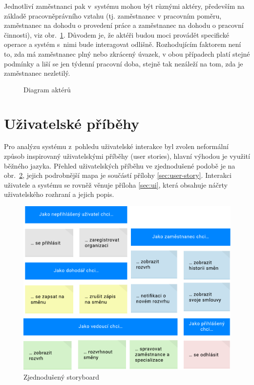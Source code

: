 \documentclass[twoside]{ctuthesis}
\begin{document}
Jednotliví zaměstnanci pak v~systému mohou být různými aktéry, především na základě pracovněprávního vztahu (tj. zaměstnanec v pracovním poměru, zaměstnanec na dohodu o provedení práce a zaměstnanec na dohodu o pracovní činnosti), viz obr.~\ref{fig:userroles}. Důvodem je, že aktéři budou moci provádět specifické operace a systém s~nimi bude interagovat odlišně. Rozhodujícím faktorem není to, zda má zaměstnanec plný nebo zkrácený úvazek, v obou případech platí stejné podmínky a liší se jen týdenní pracovní doba, stejně tak nezáleží na tom, zda je zaměstnanec nezletilý.

\begin{figure}[h]
	
	\caption{Diagram aktérů}
	\label{fig:userroles}
\end{figure}

\newpage
\section{Uživatelské příběhy}\label{uc-analysis}

Pro analýzu systému z~pohledu uživatelské interakce byl zvolen neformální způsob inspirovaný uživatelskými příběhy (user stories), hlavní výhodou je využití běžného jazyka. Přehled uživatelských příběhu ve zjednodušené podobě je na obr.~\ref{fig:user-stories}, jejich podrobnější mapa je součástí přílohy \ref{sec:user-story}. Interakci uživatele a systému se rovněž věnuje příloha \ref{sec:ui}, která obsahuje náčrty uživatelského rozhraní a jejich popis.

\begin{figure}[h!]
	\includegraphics[scale=0.7]{user-stories.pdf}
	\caption{Zjednodušený storyboard}
	\label{fig:user-stories}
\end{figure}
\end{document}
